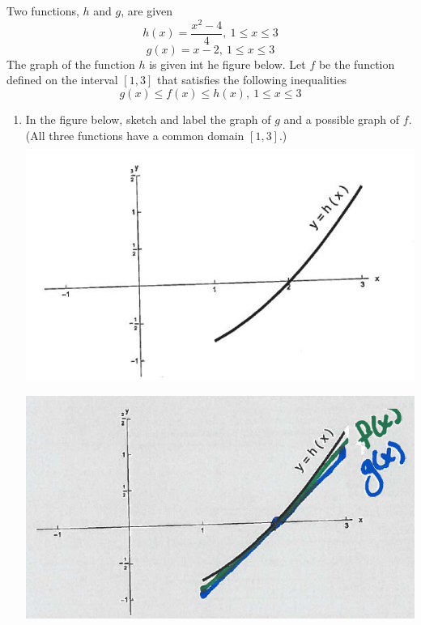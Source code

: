 \documentclass[nooutcomes, handout]{ximera}
\begin{document}
\begin{problem}
	Two functions, $h$ and $g$, are given
	\[
	h(x)=\frac{x^2-4}{4},\  1 \le x \le 3
	\]
	\[
	g(x)=x-2,\  1 \le x \le 3
	\]
The graph of the function $h$ is given int he figure below.  
Let $f$ be the function defined on the interval $[1,3]$ that satisfies the following inequalities
	\[
	g(x) \le f(x) \le h(x),\ 1 \le x \le 3
	\]

	\begin{enumerate}
	
	\item In the figure below, sketch and label the graph of $g$ and a possible graph of $f$.  (All three functions have a common domain $[1,3]$.)

	\begin{image}
	\includegraphics{Figure1}
	\end{image}
	
	\begin{freeResponse}	
	\begin{image}
	\includegraphics{Figure2}
	\end{image}
	\end{freeResponse}


\end{enumerate}
\end{problem}
\end{document}
